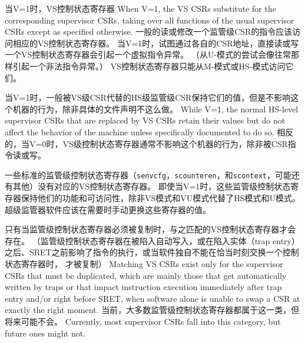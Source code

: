当V=1时，VS控制状态寄存器
When V=1, the VS CSRs substitute for the corresponding supervisor CSRs,
taking over all functions of the usual supervisor CSRs except as specified
otherwise.
一般的读或修改一个监管级CSR的指令应该访问相应的VS控制状态寄存器。
当V=1时，试图通过各自的CSR地址，直接读或写一个VS控制状态寄存器会引起一个虚拟指令异常。
（从U-模式的尝试会像往常那样引起一个非法指令异常。）
VS控制状态寄存器只能从M-模式或HS-模式访问它们。

当V=1时，一般被VS级CSR代替的HS级监管级CSR保持它们的值，但是不影响这个机器的行为，除非具体的文件声明不这么做。
While V=1, the normal HS-level supervisor CSRs that are replaced by
VS CSRs retain their values but do
not affect the behavior of the machine unless specifically documented to
do so.
相反的，当V=0时，VS级控制状态寄存器通常不影响这个机器的行为，除非被CSR指令读或写。

一些标准的监管级控制状态寄存器（{\tt senvcfg}，{\tt scounteren}，和{\tt scontext}，可能还有其他）没有对应的VS控制状态寄存器。
即使当V=1时，这些监管级控制状态寄存器保持他们的功能和可访问性，除非VS模式和VU模式代替了HS模式和U模式。
超级监管器软件应该在需要时手动更换这些寄存器的值。

\begin{commentary}
  只有当监管级控制状态寄存器必须被复制时，与之匹配的VS控制状态寄存器才会存在。
  （监管级控制状态寄存器在被陷入自动写入，或在陷入实体（trap entry）之后、SRET之前影响了指令的执行，或当软件独自不能在恰当时刻交换一个控制状态寄存器时，
  才被复制）
Matching VS CSRs exist only for the supervisor CSRs that must be
duplicated, which are mainly those that get automatically written by
traps or that impact instruction execution immediately after trap entry
and/or right before SRET, when software alone is unable to swap a CSR at
exactly the right moment.
  当前，大多数监管级控制状态寄存器都属于这一类，但将来可能不会。
Currently, most supervisor CSRs fall into this category, but future ones
might not.
\end{commentary}

